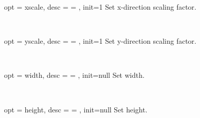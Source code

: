 \documentclass[full]{l3doc}
\begin{document}
\begin{documentation}
\bigskip

\begin{option}{ opt = xscale, desc = {= }, init=1 }
  Set x-direction scaling factor.
\end{option}\\
\begin{SideBySideExample}[frame=single,numbers=left,xrightmargin=.45\linewidth,gobble=2]
  \centering
  \quad
  \quad
\end{SideBySideExample}

\bigskip

\begin{option}{ opt = yscale, desc = {= }, init=1 }
  Set y-direction scaling factor.
\end{option}\\
\begin{SideBySideExample}[frame=single,numbers=left,xrightmargin=.45\linewidth,gobble=2]
  \centering
  \quad
  \quad
\end{SideBySideExample}

\bigskip

\begin{option}{ opt = width, desc = {= }, init=null }
  Set width.
\end{option}\\
\begin{SideBySideExample}[frame=single,numbers=left,xrightmargin=.45\linewidth,gobble=2]
  \centering
  \quad
  \quad
\end{SideBySideExample}

\bigskip

\begin{option}{ opt = height, desc = {= }, init=null }
  Set height.
\end{option}\\
\begin{SideBySideExample}[frame=single,numbers=left,xrightmargin=.45\linewidth,gobble=2]
  \centering
  \quad
  \quad
\end{SideBySideExample}


\end{documentation}
\end{document}
